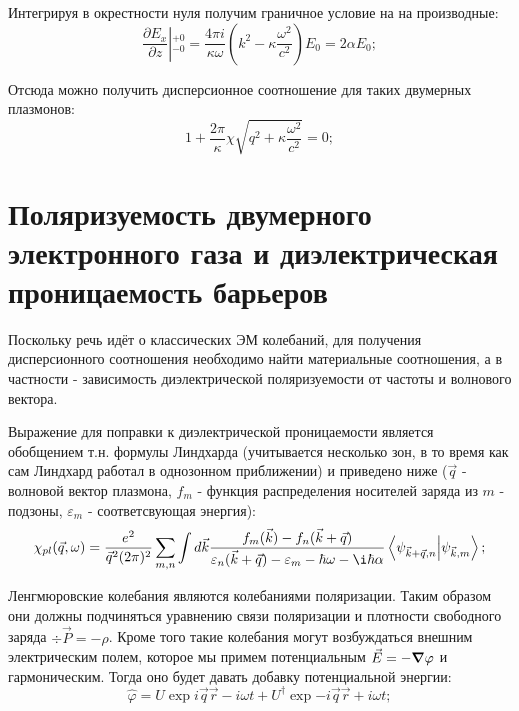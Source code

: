 \documentclass[../main.tex]{subfiles}
\begin{document}
    Интегрируя в окрестности нуля получим граничное условие на на производные:
    \begin{equation*}
        \left.\frac{\partial E_x}{\partial z}\right\vert{}^{+0}_{-0} = \frac{4\pi i}{\kappa \omega}
        \left(k^2  - \kappa \frac{\omega^2}{c^2}\right) E_0 = 2 \alpha E_0;
    \end{equation*}

    Отсюда можно получить дисперсионное соотношение для таких двумерных плазмонов:
    \begin{equation}
        \label{plasmons:edisp}
        1 + \frac{2\pi}{\kappa} \chi \sqrt{q^2 + \kappa \frac{\omega^2}{c^2}} = 0;
    \end{equation}




    
    \section{Поляризуемость двумерного электронного газа 
    и диэлектрическая проницаемость барьеров}

    Поскольку речь идёт о классических ЭМ колебаний, 
    для получения дисперсионного соотношения необходимо найти 
    материальные соотношения, а в частности - зависимость 
    диэлектрической поляризуемости от частоты и волнового вектора.


    Выражение для поправки к диэлектрической проницаемости является 
    обобщением т.н. формулы Линдхарда (учитывается несколько зон, в то 
    время как сам Линдхард работал в однозонном приближении)
    и приведено ниже ($\vec q$ - волновой вектор плазмона,
    $f_m$ - функция распределения носителей заряда из $m$ - подзоны,
    $\varepsilon_m$ - соответсвующая энергия):
    \begin{equation}
        \label{lindhard}
        \chi_{pl}(\vec q, \omega) = \frac{e^2}{\vec{q}^2 (2\pi)^2}
            \sum_{m, n} \int d\vec k \frac{f_m(\vec k) - f_n(\vec k 
                + \vec q)}{\varepsilon_n(\vec k + \vec q) - 
                \varepsilon_m - \hbar \omega - \i \hbar \alpha}
                \bra{\psi_{\vec k + \vec q,n}} \ket{\psi_{\vec k, m}};
    \end{equation}


    Ленгмюровские колебания являются колебаниями поляризации. Таким
    образом они должны подчиняться уравнению связи поляризации и 
    плотности свободного заряда $\div \vec P  = - \rho$. Кроме того 
    такие колебания могут возбуждаться внешним электрическим полем, 
    которое мы примем потенциальным $\vec E = - \grad \varphi$ и 
    гармоническим. Тогда оно будет давать добавку потенциальной энергии:
    \begin{equation}
        \label{plazmon:field}
        \hat \varphi  = U \exp{i\vec q \vec r - i \omega t}
            + U^{\dagger} \exp{-i\vec q\vec r + i \omega t};
    \end{equation}
\end{document}
